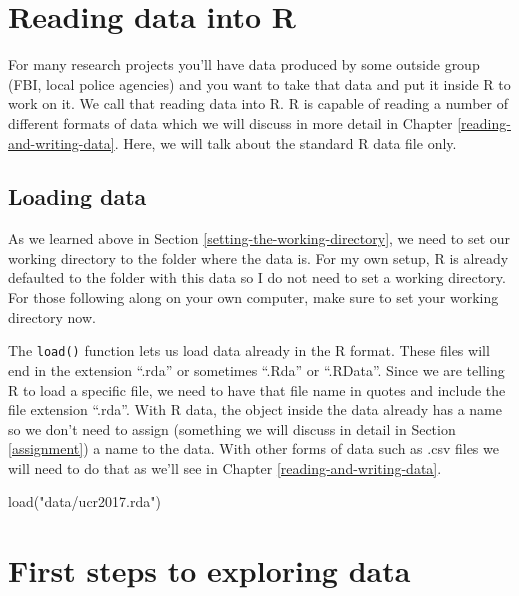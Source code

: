 \documentclass[
  12pt,
]{book}
\newenvironment{Shaded}{\begin{snugshade}}{\end{snugshade}}
\newcommand{\FunctionTok}[1]{\textcolor[rgb]{0,0,0}{#1}}
\newcommand{\NormalTok}[1]{#1}
\newcommand{\StringTok}[1]{\textcolor[rgb]{0.5,0.5,0.5}{#1}}
\begin{document}
\hypertarget{reading-data-into-r}{%
\section{Reading data into R}\label{reading-data-into-r}}

For many research projects you'll have data produced by some outside group (FBI, local police agencies) and you want to take that data and put it inside R to work on it. We call that reading data into R. R is capable of reading a number of different formats of data which we will discuss in more detail in Chapter \ref{reading-and-writing-data}. Here, we will talk about the standard R data file only.

\hypertarget{loading-data}{%
\subsection{Loading data}\label{loading-data}}

As we learned above in Section \ref{setting-the-working-directory}, we need to set our working directory to the folder where the data is. For my own setup, R is already defaulted to the folder with this data so I do not need to set a working directory. For those following along on your own computer, make sure to set your working directory now.

The \texttt{load()} function lets us load data already in the R format. These files will end in the extension ``.rda'' or sometimes ``.Rda'' or ``.RData''. Since we are telling R to load a specific file, we need to have that file name in quotes and include the file extension ``.rda''. With R data, the object inside the data already has a name so we don't need to assign (something we will discuss in detail in Section \ref{assignment}) a name to the data. With other forms of data such as .csv files we will need to do that as we'll see in Chapter \ref{reading-and-writing-data}.

\begin{Shaded}
\begin{Highlighting}[]
\FunctionTok{load}\NormalTok{(}\StringTok{"data/ucr2017.rda"}\NormalTok{)}
\end{Highlighting}
\end{Shaded}

\hypertarget{first-steps-to-exploring-data}{%
\section{First steps to exploring data}\label{first-steps-to-exploring-data}}
\end{document}
